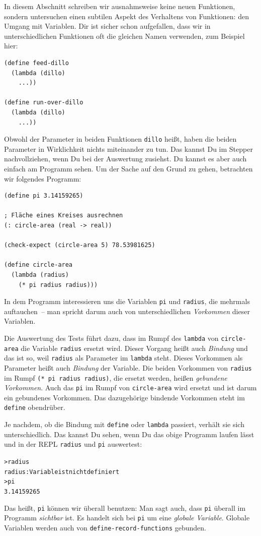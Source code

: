 
In diesem Abschnitt schreiben wir ausnahmsweise keine neuen
Funktionen, sondern untersuchen einen subtilen Aspekt des Verhaltens
von Funktionen: den Umgang mit Variablen.  Dir ist sicher schon
aufgefallen, dass wir in unterschiedlichen Funktionen oft die gleichen
Namen verwenden, zum Beispiel hier:
%
\begin{lstlisting}
(define feed-dillo
  (lambda (dillo)
    ...))

(define run-over-dillo
  (lambda (dillo)
    ...))
\end{lstlisting}
%
Obwohl der Parameter in beiden Funktionen \lstinline{dillo} heißt,
haben die beiden Parameter in Wirklichkeit nichts miteinander zu tun.
Das kannst Du im Stepper nachvollziehen, wenn Du bei der Auswertung
zusiehst.  Du kannst es aber auch einfach am Programm sehen.  Um der
Sache auf den Grund zu gehen, betrachten wir folgendes Programm:
%
\begin{lstlisting}
(define pi 3.14159265)

; Fläche eines Kreises ausrechnen
(: circle-area (real -> real))

(check-expect (circle-area 5) 78.53981625)

(define circle-area
  (lambda (radius)
    (* pi radius radius)))
\end{lstlisting}
%
In dem Programm interessieren uns die Variablen \lstinline{pi} und
\lstinline{radius}, die mehrmals auftauchen~-- man spricht darum auch
von unterschiedlichen \textit{Vorkommen} dieser
Variablen.

Die Auswertung des Tests führt dazu, dass im Rumpf des
\lstinline{lambda} von \lstinline{circle-area} die Variable
\lstinline{radius} ersetzt wird.  Dieser Vorgang heißt auch
\textit{Bindung} und das ist so, weil
\lstinline{radius} als Parameter im \lstinline{lambda} steht.  Dieses
Vorkommen als Parameter heißt auch \textit{Bindung} der Variable.  Die beiden
Vorkommen von \lstinline{radius} im Rumpf
\lstinline{(* pi radius radius)}, die ersetzt werden,
heißen \textit{gebundene
  Vorkommen}.  Auch das \lstinline{pi} im
Rumpf von \lstinline{circle-area} wird ersetzt und ist darum ein
gebundenes Vorkommen.  Das dazugehörige bindende Vorkommen steht im
\lstinline{define} obendrüber.

Je nachdem, ob die Bindung mit \lstinline{define} oder
\lstinline{lambda} passiert, verhält sie sich unterschiedlich.  Das
kannst Du sehen, wenn Du das obige Programm laufen lässt und in der
REPL \lstinline{radius} und \lstinline{pi} auswertest:
%
\begin{alltt}
> radius
{\color{red}radius: Variable ist nicht definiert}
> pi
{\color{blue}3.14159265}
\end{alltt}
%
Das heißt, \lstinline{pi} können wir überall benutzen: Man sagt auch,
dass \lstinline{pi} überall im Programm
\textit{sichtbar} ist.  Es handelt sich bei
\lstinline{pi} um eine \textit{globale Variable}.  Globale Variablen werden auch von
\lstinline{define-record-functions} gebunden.

